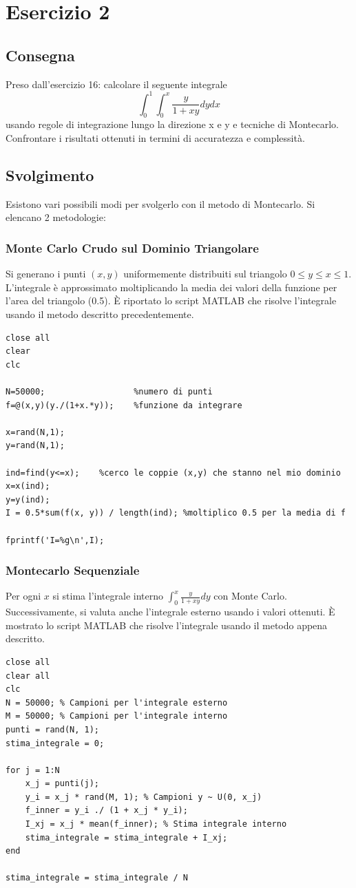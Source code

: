 \documentclass[11pt]{article}
\begin{document}
\section{Esercizio 2}
\subsection{Consegna}
Preso dall'esercizio 16: calcolare il seguente integrale
\[
\int_0^1{\int_0^x{\frac{y}{1+xy}dy}dx}
\]
usando regole di integrazione lungo la direzione x e y e tecniche di Montecarlo. Confrontare i risultati ottenuti in termini di accuratezza e complessità.
\subsection{Svolgimento}
Esistono vari possibili modi per svolgerlo con il metodo di Montecarlo. Si elencano 2 metodologie:
\subsubsection{Monte Carlo Crudo sul Dominio Triangolare}
Si generano i punti $(x,y)$ uniformemente distribuiti sul triangolo $0\leq y \leq x\leq1$. L'integrale è approssimato moltiplicando la media dei valori della funzione per l'area del triangolo (0.5). È riportato lo script MATLAB che risolve l'integrale usando il metodo descritto precedentemente.
\begin{lstlisting}
close all
clear 
clc

N=50000;                  %numero di punti
f=@(x,y)(y./(1+x.*y));    %funzione da integrare

x=rand(N,1); 
y=rand(N,1);

ind=find(y<=x);    %cerco le coppie (x,y) che stanno nel mio dominio
x=x(ind);               
y=y(ind);
I = 0.5*sum(f(x, y)) / length(ind); %moltiplico 0.5 per la media di f

fprintf('I=%g\n',I);
\end{lstlisting}
\subsubsection{Montecarlo Sequenziale}
Per ogni $x$ si stima l'integrale interno $\int_0^x{\frac{y}{1+xy}}dy$ con Monte Carlo. Successivamente, si valuta anche l'integrale esterno usando i valori ottenuti. È mostrato lo script MATLAB che risolve l'integrale usando il metodo appena descritto.
\begin{lstlisting}
close all
clear all
clc
N = 50000; % Campioni per l'integrale esterno
M = 50000; % Campioni per l'integrale interno
punti = rand(N, 1);
stima_integrale = 0;

for j = 1:N
    x_j = punti(j);
    y_i = x_j * rand(M, 1); % Campioni y ~ U(0, x_j)
    f_inner = y_i ./ (1 + x_j * y_i);
    I_xj = x_j * mean(f_inner); % Stima integrale interno
    stima_integrale = stima_integrale + I_xj;
end

stima_integrale = stima_integrale / N
\end{lstlisting}
\end{document}

